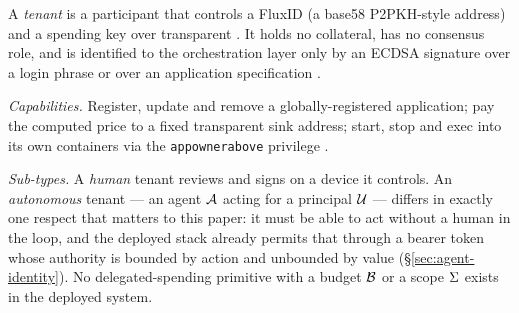 \begin{definition}[Tenant]
\label{def:tenant}
\shipped A \emph{tenant} is a participant that controls a FluxID (a base58 P2PKH-style address) and a
spending key over transparent \flux. It holds no collateral, has no consensus role, and is
identified to the orchestration layer only by an ECDSA signature over a login phrase or over an
application specification .

\emph{Capabilities.} Register, update and remove a globally-registered application; pay the
computed price to a fixed transparent sink address; start, stop and exec into its own containers via
the \texttt{appownerabove} privilege .

\emph{Sub-types.} A \emph{human} tenant reviews and signs on a device it controls. An
\emph{autonomous} tenant --- an agent $\mathcal{A}$ acting for a principal $\mathcal{U}$ --- differs in
exactly one respect that matters to this paper: it must be able to act without a human in the loop,
and the deployed stack already permits that through a bearer token whose authority is bounded by
action and unbounded by value (\S\ref{sec:agent-identity}). No delegated-spending primitive with a
budget $\mathcal{B}$ or a scope $\Sigma$ exists in the deployed system.
\end{definition}

